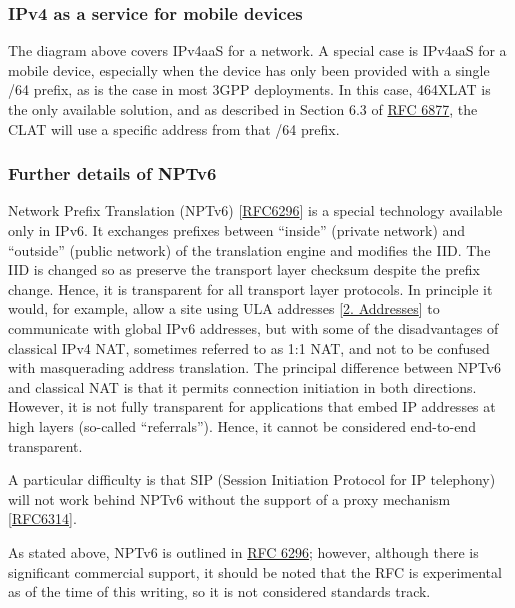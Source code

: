 \documentclass[
]{article}
\begin{document}
\subsubsection{IPv4 as a service for mobile
devices}\label{ipv4-as-a-service-for-mobile-devices}

The diagram above covers IPv4aaS for a network. A special case is
IPv4aaS for a mobile device, especially when the device has only been
provided with a single /64 prefix, as is the case in most 3GPP
deployments. In this case, 464XLAT is the only available solution, and
as described in Section 6.3 of
\href{https://www.rfc-editor.org/info/rfc6877}{RFC 6877}, the CLAT will
use a specific address from that /64 prefix.

\subsubsection{Further details of NPTv6}\label{further-details-of-nptv6}

Network Prefix Translation (NPTv6)
{[}\href{https://www.rfc-editor.org/info/rfc6296}{RFC6296}{]} is a
special technology available only in IPv6. It exchanges prefixes between
``inside'' (private network) and ``outside'' (public network) of the
translation engine and modifies the IID. The IID is changed so as
preserve the transport layer checksum despite the prefix change. Hence,
it is transparent for all transport layer protocols. In principle it
would, for example, allow a site using ULA addresses
{[}\hyperref[addresses]{2. Addresses}{]} to communicate with global IPv6
addresses, but with some of the disadvantages of classical IPv4 NAT,
sometimes referred to as 1:1 NAT, and not to be confused with
masquerading address translation. The principal difference between NPTv6
and classical NAT is that it permits connection initiation in both
directions. However, it is not fully transparent for applications that
embed IP addresses at high layers (so-called ``referrals''). Hence, it
cannot be considered end-to-end transparent.

A particular difficulty is that SIP (Session Initiation Protocol for IP
telephony) will not work behind NPTv6 without the support of a proxy
mechanism {[}\href{https://www.rfc-editor.org/info/rfc6314}{RFC6314}{]}.

As stated above, NPTv6 is outlined in
\href{https://www.rfc-editor.org/info/rfc6296}{RFC 6296}; however,
although there is significant commercial support, it should be noted
that the RFC is experimental as of the time of this writing, so it is
not considered standards track.
\end{document}
